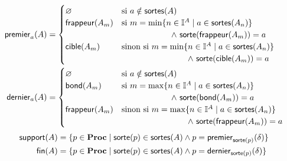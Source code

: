 \begin{definition}
  \begin{align*}
    \mathsf{premier}_{a}(A) &=
      \begin{cases}
        \varnothing & \text{si } a \notin \mathsf{sortes}(A) \\
        \mathsf{frappeur}(A_m) & \text{si } m = \min\{ n \in \mathbb{I}^{A} \mid a \in \mathsf{sortes}(A_n) \} \\
          & \hspace*{6em} \wedge\ \mathsf{sorte}(\mathsf{frappeur}(A_m)) = a \\
        \mathsf{cible}(A_m) & \text{sinon si } m = \min\{ n \in \mathbb{I}^{A} \mid a \in \mathsf{sortes}(A_n) \} \\
          & \hspace*{8em} \wedge\ \mathsf{sorte}(\mathsf{cible}(A_m)) = a
      \end{cases} \\
    \mathsf{dernier}_{a}(A) &=
      \begin{cases}
        \varnothing & \text{si } a \notin \mathsf{sortes}(A) \\
        \mathsf{bond}(A_m) & \text{si } m = \max\{ n \in \mathbb{I}^{A} \mid a \in \mathsf{sortes}(A_n) \} \\
          & \hspace*{6em} \wedge\ \mathsf{sorte}(\mathsf{bond}(A_m)) = a \\
        \mathsf{frappeur}(A_m) & \text{sinon si } m = \max\{ n \in \mathbb{I}^{A} \mid a \in \mathsf{sortes}(A_n) \} \\
          & \hspace*{8em} \wedge\ \mathsf{sorte}(\mathsf{frappeur}(A_m)) = a
      \end{cases}
  \end{align*}
  \begin{align*}
    \mathsf{support}(A) &= \{ p \in \mathbf{Proc} \mid \mathsf{sorte}(p) \in \mathsf{sortes}(A) \wedge
      p = \mathsf{premier}_{\mathsf{sorte}(p)}(\delta) \} \\
    \mathsf{fin}(A) &= \{ p \in \mathbf{Proc} \mid \mathsf{sorte}(p) \in \mathsf{sortes}(A) \wedge
      p = \mathsf{dernier}_{\mathsf{sorte}(p)}(\delta) \}
  \end{align*}
\end{definition}

